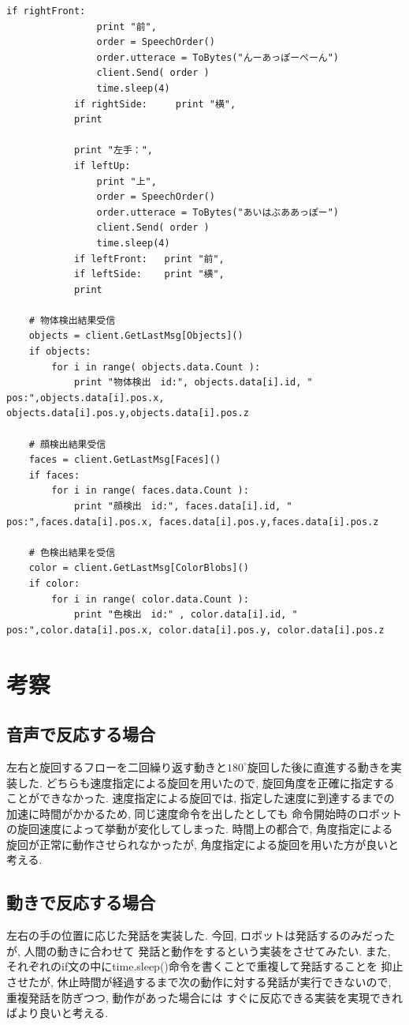 \documentclass[a4paper,11pt,titlepage]{jsarticle}
\begin{document}
\begin{lstlisting}[basicstyle=\ttfamily\footnotesize, caption = VisionTest.py, breaklines = true]
            if rightFront:
                print "前",
                order = SpeechOrder()
                order.utterace = ToBytes("んーあっぽーぺーん")
                client.Send( order )
                time.sleep(4)
            if rightSide:     print "横",
            print

            print "左手：",
            if leftUp:
                print "上",
                order = SpeechOrder()
                order.utterace = ToBytes("あいはぶああっぽー")
                client.Send( order )
                time.sleep(4)
            if leftFront:   print "前",
            if leftSide:    print "横",
            print

    # 物体検出結果受信
    objects = client.GetLastMsg[Objects]()
    if objects:
        for i in range( objects.data.Count ):
            print "物体検出　id:", objects.data[i].id, " pos:",objects.data[i].pos.x, objects.data[i].pos.y,objects.data[i].pos.z

    # 顔検出結果受信
    faces = client.GetLastMsg[Faces]()
    if faces:
        for i in range( faces.data.Count ):
            print "顔検出　id:", faces.data[i].id, " pos:",faces.data[i].pos.x, faces.data[i].pos.y,faces.data[i].pos.z

    # 色検出結果を受信
    color = client.GetLastMsg[ColorBlobs]()
    if color:
        for i in range( color.data.Count ):
            print "色検出　id:" , color.data[i].id, " pos:",color.data[i].pos.x, color.data[i].pos.y, color.data[i].pos.z
\end{lstlisting}

\section{考察}
\subsection{音声で反応する場合}
左右と旋回するフローを二回繰り返す動きと$180^{\circ}$旋回した後に直進する動きを実装した.
どちらも速度指定による旋回を用いたので, 旋回角度を正確に指定することができなかった.
速度指定による旋回では, 指定した速度に到達するまでの加速に時間がかかるため, 同じ速度命令を出したとしても
命令開始時のロボットの旋回速度によって挙動が変化してしまった. 時間上の都合で, 角度指定による旋回が正常に動作させられなかったが, 角度指定による旋回を用いた方が良いと考える.

\subsection{動きで反応する場合}
 左右の手の位置に応じた発話を実装した. 今回, ロボットは発話するのみだったが, 人間の動きに合わせて
 発話と動作をするという実装をさせてみたい. また, それぞれのif文の中にtime.sleep()命令を書くことで重複して発話することを
 抑止させたが, 休止時間が経過するまで次の動作に対する発話が実行できないので, 重複発話を防ぎつつ, 動作があった場合には
 すぐに反応できる実装を実現できればより良いと考える.
\end{document}
